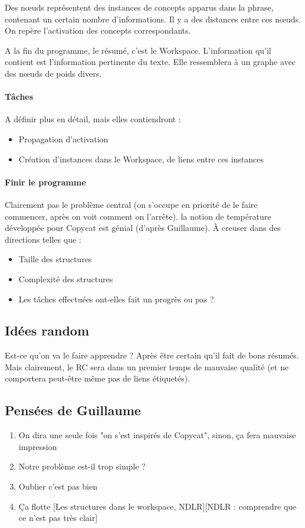 \documentclass{article}
\begin{document}
Des nœuds représentent des instances de concepts apparus dans la phrase, contenant un certain nombre d'informations. Il y a des distances entre ces nœuds. On repère l'activation des concepts correspondants.

A la fin du programme, le résumé, c'est le Workspace. L'information qu'il contient est l'information pertinente du texte. Elle ressemblera à un graphe avec des nœuds de poids divers.

\paragraph{Tâches}
A définir plus en détail, mais elles contiendront :
\begin{itemize}
 \item Propagation d'activation
 \item Création d'instances dans le Workspace, de liens entre ces instances
\end{itemize}

\paragraph{Finir le programme}
Clairement pas le problème central (on s'occupe en priorité de le faire commencer, après on voit comment on l'arrête). la notion de température développée pour Copycat est génial (d'après Guillaume). À creuser dans des directions telles que :
\begin{itemize}
 \item Taille des structures
 \item Complexité des structures
 \item Les tâches effectuées ont-elles fait un progrès ou pas ?
\end{itemize}



\subsection{Idées random}
Est-ce qu'on va le faire apprendre ? Après être certain qu'il fait de bons résumés. Mais clairement, le RC sera dans un premier temps de mauvaise qualité (et ne comportera peut-être même pas de liens étiquetés).
\subsection{Pensées de Guillaume}

\begin{enumerate}
 \item On dira une seule fois "on s'est inspirés de Copycat", sinon, ça fera mauvaise impression
 \item Notre problème est-il trop simple ?
 \item Oublier c'est pas bien
 \item Ça flotte [Les structures dans le workspace, NDLR][NDLR : comprendre que ce n'est pas très clair]
\end{enumerate}
\end{document}
